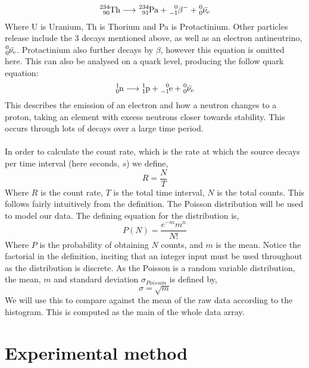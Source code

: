 \documentclass[11pt]{article}
\begin{document}
    $$\ce{^{234}_{90}Th} \longrightarrow \ce{^{234}_{91}Pa} + \ce{^{0}_{-1}\beta^{-}} + \ce{^{0}_{0}\bar{\nu_{e}}} $$
   Where U is Uranium, Th is Thorium and Pa is Protactinium. Other particles release include the 3 decays mentioned above, as well as an electron antineutrino,$\ce{^{0}_{0}\bar{\nu_{e}}}$. Protactinium also further decays by $\beta$, however this equation is omitted here. This can also be analysed on a quark level, producing the follow quark equation:
 \newline
  $$ \ce{^{1}_{0}n} \longrightarrow \ce{^{1}_{1}p} + \ce{^{0}_{-1}e} + \ce{^{0}_{0}\bar{\nu_{e}}} $$
\newline
This describes the emission of an electron and how a neutron changes to a proton, taking an element with excess neutrons closer towards stability. This occurs through lots of decays over a large time period. 
   \\
   \\
   In order to calculate the count rate, which is the rate at which the source decays per time interval (here seconds, $s$)  we define, 
   \begin{equation} R = \frac{N}{T}
   \end{equation}
   Where $R$ is the count rate, $T$ is the total time interval, $N$ is the total counts. This follows fairly intuitively from the definition. 
    The Poisson distribution will be used to model our data. The defining equation for the distribution is, 
    \begin{equation}
        P(N) = \frac{e^{-m}m^{n}}{N!}
    \end{equation}
    Where $P$ is the probability of obtaining $N$ counts, and $m$ is the mean. Notice the factorial in the definition, inciting that an integer input must be used throughout as the distribution is discrete. 
    As the Poisson is a random variable distribution, the mean, $m$ and standard deviation $\sigma_{Poisson}$ is defined by,
    \begin{equation}
        \sigma = \sqrt{m}
    \end{equation}
    We will use this to compare against the mean of the raw data according to the histogram. This is computed as the main of the whole data array. 
     \newline 
    \section{Experimental method}
\end{document}
